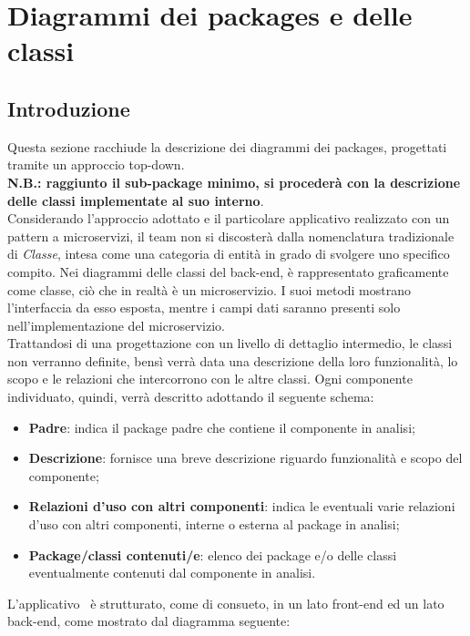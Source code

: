 \newpage
\section{Diagrammi dei packages e delle classi}

\subsection{Introduzione}
Questa sezione racchiude la descrizione dei diagrammi dei packages, progettati tramite un approccio top-down.\\ \textbf{N.B.: raggiunto il sub-package minimo, si procederà con la descrizione delle classi implementate al suo interno}.\\
Considerando l'approccio adottato e il particolare applicativo realizzato con un pattern a microservizi, il team non si discosterà dalla nomenclatura tradizionale di \textit{Classe}, intesa come una categoria di entità in grado di svolgere uno specifico compito. Nei diagrammi delle classi del back-end, è rappresentato graficamente come classe, ciò che in realtà è un microservizio. I suoi metodi mostrano l'interfaccia da esso esposta, mentre i campi dati saranno presenti solo nell'implementazione del microservizio.\\
Trattandosi di una progettazione con un livello di dettaglio intermedio, le classi non verranno definite, bensì verrà data una descrizione della loro funzionalità, lo scopo e le relazioni che intercorrono con le altre classi. Ogni componente individuato, quindi, verrà descritto adottando il seguente schema:
\begin{itemize}
	\item \textbf{Padre}: indica il package padre che contiene il componente in analisi;
	
	\item \textbf{Descrizione}: fornisce una breve descrizione riguardo funzionalità e scopo del componente;
	
	\item \textbf{Relazioni d'uso con altri componenti}: indica le eventuali varie relazioni d'uso con altri componenti, interne o esterna al package in analisi;
	
	\item \textbf{Package/classi contenuti/e}: elenco dei package e/o delle classi eventualmente contenuti dal componente in analisi.
\end{itemize}
L'applicativo \progetto\ è strutturato, come di consueto, in un lato front-end ed un lato back-end, come mostrato dal diagramma seguente:

